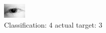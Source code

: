 \begin{figure}[h!]
\begin{center}
\includegraphics[width=0.60\columnwidth]{figures/ID108_class_4_target_3.png}
\end{center}
\caption{ Classification: 4 actual target: 3}
\label{fig:ID108_class_4_target_3}
\end{figure}
